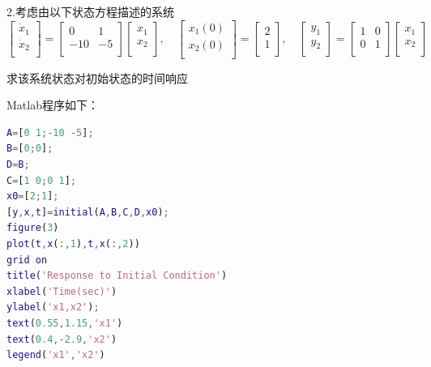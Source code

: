 \documentclass[UTF8]{ctexart}
\begin{document}
\par 2.考虑由以下状态方程描述的系统
\begin{equation}
    \begin{bmatrix}
    \dot x_1\\
    \dot x_2\\
    \end{bmatrix}=\begin{bmatrix}
    0 & 1 \\
    -10 & -5 \\ \end{bmatrix}\begin{bmatrix}
    x_1\\
    x_2\\
    \end{bmatrix} ,  \quad \begin{bmatrix}
    x_1(0)\\
    x_2(0)\\
    \end{bmatrix}=\begin{bmatrix}
    2  \\
    1  \\
    \end{bmatrix}  ,  \quad  \begin{bmatrix}
    y_1\\
    y_2\\
    \end{bmatrix}=\begin{bmatrix}
    1 & 0 \\
    0 & 1 \\ \end{bmatrix}\begin{bmatrix}
    x_1\\
    x_2\\
    \end{bmatrix}
\end{equation}
\par 求该系统状态对初始状态的时间响应

\par Matlab程序如下：
\par  \begin{lstlisting}[language=matlab,escapeinside=``]
A=[0 1;-10 -5];
B=[0;0];
D=B;
C=[1 0;0 1];
x0=[2;1];
[y,x,t]=initial(A,B,C,D,x0);
figure(3)
plot(t,x(:,1),t,x(:,2))
grid on
title('Response to Initial Condition')
xlabel('Time(sec)')
ylabel('x1,x2');
text(0.55,1.15,'x1')
text(0.4,-2.9,'x2')
legend('x1','x2')
\end{lstlisting}
\end{document}
